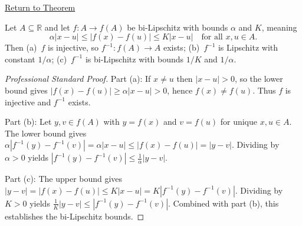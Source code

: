 \newpage
{}
\label{prf:bilipschitz-inverse-is-lipschitz}

\begin{remark*}[Return]
\hyperref[thm:bilipschitz-inverse-is-lipschitz]{Return to Theorem}
\end{remark*}

\begin{theorem*}
Let $A \subseteq \mathbb{R}$ and let $f : A \to f(A)$ be bi-Lipschitz with bounds $\alpha$ and $K$, meaning
\[
  \alpha|x - u| \leq |f(x) - f(u)| \leq K|x - u|
  \quad \text{for all } x, u \in A.
\]
Then (a)~$f$ is injective, so $f^{-1} : f(A) \to A$ exists; (b)~$f^{-1}$ is Lipschitz with constant $1/\alpha$; (c)~$f^{-1}$ is bi-Lipschitz with bounds $1/K$ and $1/\alpha$.
\end{theorem*}

\begin{proof}[Professional Standard Proof]
\LRAProofBodyStart
Part (a): If $x \neq u$ then $|x - u| > 0$, so the lower bound gives $|f(x) - f(u)| \geq \alpha|x - u| > 0$, hence $f(x) \neq f(u)$. Thus $f$ is injective and $f^{-1}$ exists.

Part (b): Let $y, v \in f(A)$ with $y = f(x)$ and $v = f(u)$ for unique $x, u \in A$. The lower bound gives $\alpha|f^{-1}(y) - f^{-1}(v)| = \alpha|x - u| \leq |f(x) - f(u)| = |y - v|$. Dividing by $\alpha > 0$ yields $|f^{-1}(y) - f^{-1}(v)| \leq \frac{1}{\alpha}|y - v|$.

Part (c): The upper bound gives $|y - v| = |f(x) - f(u)| \leq K|x - u| = K|f^{-1}(y) - f^{-1}(v)|$. Dividing by $K > 0$ yields $\frac{1}{K}|y - v| \leq |f^{-1}(y) - f^{-1}(v)|$. Combined with part (b), this establishes the bi-Lipschitz bounds.
\end{proof}

